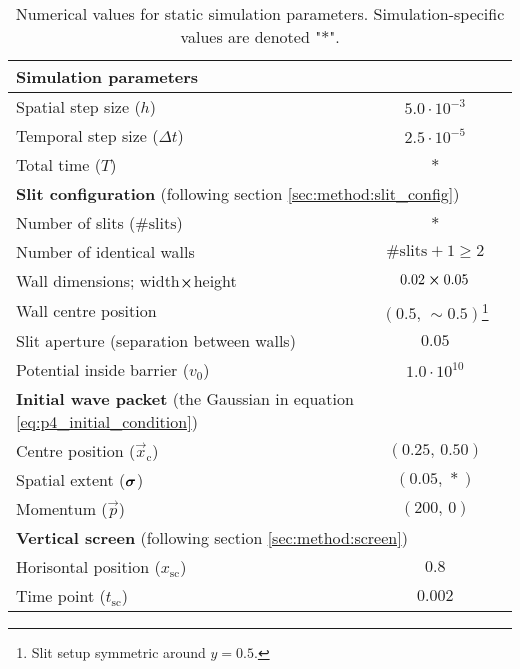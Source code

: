         \begin{table}[ht!]
            \centering
            \begin{tabular}{l|c}
                \hline
                \multicolumn{2}{l}{\textbf{Simulation parameters} \Nanna{??}} \\
                \hline
                Spatial step size ($h$)         & $5.0 \cdot 10^{-3}$   \\
                Temporal step size ($\Delta t$) & $2.5 \cdot 10^{-5}$   \\
                Total time ($T$)                & $*$                   \\
                \hline
                \multicolumn{2}{l}{\textbf{Slit configuration} (following section \ref{sec:method:slit_config})} \\
                \hline
                Number of slits ($\#\mathrm{slits}$)    & $*$                           \\
                Number of identical walls               & $\#\mathrm{slits} + 1 \geq 2$ \\
                Wall dimensions; width$\cross$height    & $0.02\cross 0.05$             \\
                Wall centre position                    & $(0.5,\, \sim\!0.5)$\footnote{Slit setup symmetric around $y=0.5$.}   \\
                Slit aperture (separation between walls)& $0.05$                        \\
                Potential inside barrier ($v_0$)        & $1.0\cdot 10^{10}$            \\
                \hline
                \multicolumn{2}{l}{\textbf{Initial wave packet} (the Gaussian in equation \eqref{eq:p4_initial_condition})} \\
                \hline
                Centre position ($\vec{x}_\mathrm{c}$)  & $(0.25,\,0.50)$           \\
                Spatial extent ($\boldsymbol{\sigma}$)        & $(0.05, \,*)$             \\
                Momentum ($\vec{p}$)                    & $(200,\, 0)$              \\
                \hline
                \multicolumn{2}{l}{\textbf{Vertical screen} (following section \ref{sec:method:screen})} \\
                \hline
                Horisontal position ($x_\mathrm{sc}$)   & $0.8$     \\
                Time point ($t_\mathrm{sc}$)            & $0.002$   \\
                \hline
            \end{tabular}
            \caption{Numerical values for static simulation parameters. Simulation-specific values are denoted "$*$".}
            \label{tab:simulation_parameters}
        \end{table}




